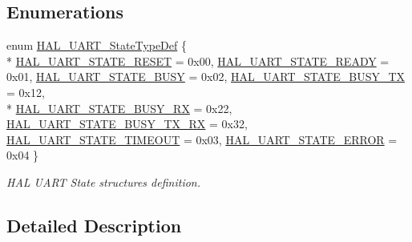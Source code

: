 \subsection*{Enumerations}
\begin{DoxyCompactItemize}
\item 
enum \hyperlink{group___u_a_r_t___exported___types_gaf55d844a35379c204c90be5d1e8e50ba}{H\+A\+L\+\_\+\+U\+A\+R\+T\+\_\+\+State\+Type\+Def} \{ \\*
\hyperlink{group___u_a_r_t___exported___types_ggaf55d844a35379c204c90be5d1e8e50baa9c7d889fce61ccc717228d099a61d113}{H\+A\+L\+\_\+\+U\+A\+R\+T\+\_\+\+S\+T\+A\+T\+E\+\_\+\+R\+E\+S\+ET} = 0x00, 
\hyperlink{group___u_a_r_t___exported___types_ggaf55d844a35379c204c90be5d1e8e50baade763629c1bdb4f08e52ef79d6e0900e}{H\+A\+L\+\_\+\+U\+A\+R\+T\+\_\+\+S\+T\+A\+T\+E\+\_\+\+R\+E\+A\+DY} = 0x01, 
\hyperlink{group___u_a_r_t___exported___types_ggaf55d844a35379c204c90be5d1e8e50baad1eddce038ba828e8b4061a33a2d8801}{H\+A\+L\+\_\+\+U\+A\+R\+T\+\_\+\+S\+T\+A\+T\+E\+\_\+\+B\+U\+SY} = 0x02, 
\hyperlink{group___u_a_r_t___exported___types_ggaf55d844a35379c204c90be5d1e8e50baadc97ca42e9b05a08cb98e6721e27e80c}{H\+A\+L\+\_\+\+U\+A\+R\+T\+\_\+\+S\+T\+A\+T\+E\+\_\+\+B\+U\+S\+Y\+\_\+\+TX} = 0x12, 
\\*
\hyperlink{group___u_a_r_t___exported___types_ggaf55d844a35379c204c90be5d1e8e50baaf7929f7aebd6b450c25907904411680b}{H\+A\+L\+\_\+\+U\+A\+R\+T\+\_\+\+S\+T\+A\+T\+E\+\_\+\+B\+U\+S\+Y\+\_\+\+RX} = 0x22, 
\hyperlink{group___u_a_r_t___exported___types_ggaf55d844a35379c204c90be5d1e8e50baa2fdde93f9f55972b7133bf7c75dd2e8a}{H\+A\+L\+\_\+\+U\+A\+R\+T\+\_\+\+S\+T\+A\+T\+E\+\_\+\+B\+U\+S\+Y\+\_\+\+T\+X\+\_\+\+RX} = 0x32, 
\hyperlink{group___u_a_r_t___exported___types_ggaf55d844a35379c204c90be5d1e8e50baa90891eeb767df19780e620a15bec807d}{H\+A\+L\+\_\+\+U\+A\+R\+T\+\_\+\+S\+T\+A\+T\+E\+\_\+\+T\+I\+M\+E\+O\+UT} = 0x03, 
\hyperlink{group___u_a_r_t___exported___types_ggaf55d844a35379c204c90be5d1e8e50baa5d50bfe0750db02c4fd03d778c8c318c}{H\+A\+L\+\_\+\+U\+A\+R\+T\+\_\+\+S\+T\+A\+T\+E\+\_\+\+E\+R\+R\+OR} = 0x04
 \}\begin{DoxyCompactList}\small\item\em H\+AL U\+A\+RT State structures definition. \end{DoxyCompactList}
\end{DoxyCompactItemize}


\subsection{Detailed Description}


